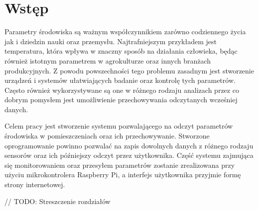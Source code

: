 \chapter{Wstęp}

Parametry środowiska są ważnym współczynnikiem zarówno codziennego życia jak
i dziedzin nauki oraz przemysłu. Najtrafniejszym przykładem jest temperatura, 
która wpływa w znaczny sposób na działania człowieka, będąc również istotnym
parametrem w agrokulturze oraz innych branżach produkcyjnych. Z powodu powszechności
tego problemu zasadnym jest stworzenie urządzeń i systemów ułatwiających badanie
oraz kontrolę tych parametrów. Często również wykorzystywane są one w różnego rodzaju
analizach przez co dobrym pomysłem jest umożliwienie przechowywania odczytanych
wcześniej danych.


Celem pracy jest stworzenie systemu pozwalającego na odczyt parametrów środowiska
w pomieszczeniach oraz ich przechowywanie. Stworzone oprogramowanie powinno pozwalać
na zapis dowolnych danych z różnego rodzaju sensorów oraz ich późniejszy odczyt
przez użytkownika. Część systemu zajmująca się monitorowaniem oraz przesyłem
parametrów zostanie zrealizowana przy użyciu mikrokontrolera Raspberry Pi, a
interfejs użytkownika przyjmie formę strony internetowej. 


// TODO: Streszczenie rozdziałów
